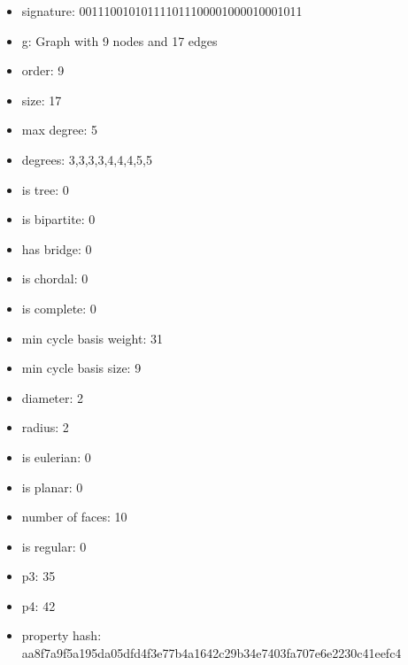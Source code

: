 \newpage
\begin{figure}
\end{figure}
\begin{itemize}
\item signature: 001110010101111011100001000010001011
\item g: Graph with 9 nodes and 17 edges
\item order: 9
\item size: 17
\item max degree: 5
\item degrees: 3,3,3,3,4,4,4,5,5
\item is tree: 0
\item is bipartite: 0
\item has bridge: 0
\item is chordal: 0
\item is complete: 0
\item min cycle basis weight: 31
\item min cycle basis size: 9
\item diameter: 2
\item radius: 2
\item is eulerian: 0
\item is planar: 0
\item number of faces: 10
\item is regular: 0
\item p3: 35
\item p4: 42
\item property hash: aa8f7a9f5a195da05dfd4f3e77b4a1642c29b34e7403fa707e6e2230c41eefc4
\end{itemize}
